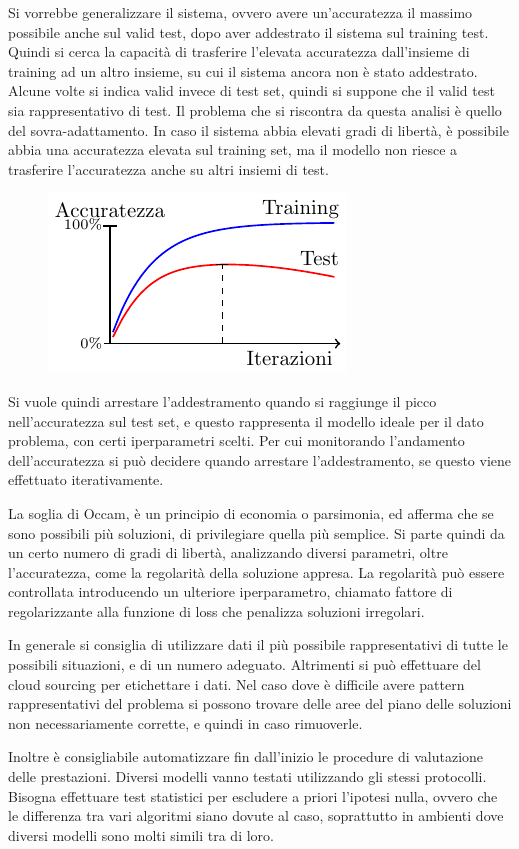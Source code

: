 \documentclass{article}
\numberwithin{equation}{subsection}
\begin{document}
Si vorrebbe generalizzare il sistema, ovvero avere un'accuratezza il massimo possibile 
anche sul valid test, dopo aver addestrato il sistema sul training test. Quindi si cerca la capacità di trasferire l'elevata accuratezza dall'insieme di training ad un altro insieme, su cui il sistema ancora non è stato addestrato. 
Alcune volte si indica valid invece di test set, quindi si suppone che il valid test sia 
rappresentativo di test. Il problema che si riscontra da questa analisi è quello del sovra-adattamento. In caso il sistema abbia elevati gradi di libertà, è possibile abbia una accuratezza elevata sul training set, ma il modello non riesce a trasferire l'accuratezza anche su altri insiemi di test. 

\begin{figure}[H]%
    \centering%
    \includegraphics{overfitting.pdf}%
\end{figure}

Si vuole quindi arrestare l'addestramento quando si raggiunge il picco nell'accuratezza sul test set, e questo rappresenta il modello ideale per il dato problema, con certi iperparametri scelti. Per cui monitorando l'andamento dell'accuratezza si può decidere quando arrestare l'addestramento, se questo viene effettuato iterativamente. 

La soglia di Occam, è un principio di economia o parsimonia, ed afferma che se sono possibili più soluzioni, di privilegiare quella più semplice. 
Si parte quindi da un certo numero di gradi di libertà, analizzando diversi parametri, oltre l'accuratezza, come la regolarità della soluzione appresa. La regolarità può essere controllata introducendo un ulteriore iperparametro, chiamato fattore di regolarizzante alla 
funzione di loss che penalizza soluzioni irregolari. 

In generale si consiglia di utilizzare dati il più possibile rappresentativi di tutte le possibili situazioni, e di un numero adeguato. Altrimenti si può effettuare del cloud sourcing per etichettare i dati. 
Nel caso dove è difficile avere pattern rappresentativi del problema si possono trovare delle aree del piano delle soluzioni non necessariamente corrette, e quindi in caso rimuoverle. 

Inoltre è consigliabile automatizzare fin dall'inizio le procedure di valutazione delle prestazioni. Diversi modelli vanno testati utilizzando gli stessi protocolli. Bisogna effettuare test statistici per escludere a priori l'ipotesi nulla, ovvero che le differenza tra vari algoritmi siano dovute al caso, soprattutto in ambienti dove diversi modelli sono molti simili tra di loro. 
\end{document}
